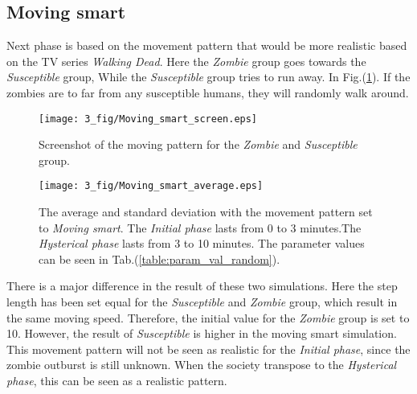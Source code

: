 \documentclass[%
twoside,                 %
final,                   %
chapterprefix=true,      %
open=right               %
10pt]{book}
\begin{document}
\noindent

\subsection{Moving smart}
Next phase is based on the movement pattern that would be more realistic based on the TV series \emph{Walking Dead}. Here the \emph{Zombie} group goes towards the \emph{Susceptible} group, While the \emph{Susceptible} group tries to run away. In Fig.(\ref{fig:screenshoot_moving_smart}). If the zombies are to far from any susceptible humans, they will randomly walk around.  


\begin{figure}[ht]
  \centerline{\texttt{[image: 3\_fig/Moving\_smart\_screen.eps]}}
  \caption{
  \label{fig:screenshoot_moving_smart} Screenshot of the moving pattern for the \emph{Zombie} and \emph{Susceptible} group.
  }
\end{figure}



\begin{figure}[ht]
  \centerline{\texttt{[image: 3\_fig/Moving\_smart\_average.eps]}}
  \caption{
  The average and standard deviation with the movement pattern set to \emph{Moving smart}. The \emph{Initial phase} lasts from 0 to 3 minutes.The \emph{Hysterical phase} lasts from 3 to 10 minutes. The parameter values can be seen in Tab.(\ref{table:param_val_random}).
  }
\end{figure}


There is a major difference in the result of these two simulations. Here the step length has been set equal for the \emph{Susceptible} and \emph{Zombie} group, which result in the same moving speed. Therefore, the initial value for the \emph{Zombie} group is set to 10. However, the result of \emph{Susceptible} is higher in the moving smart simulation. This movement pattern will not be seen as realistic for the \emph{Initial phase}, since the zombie outburst is still unknown. When the society transpose to the \emph{Hysterical phase}, this can be seen as a realistic pattern.  

\label{table:frederikke_table_random}
\end{document}
